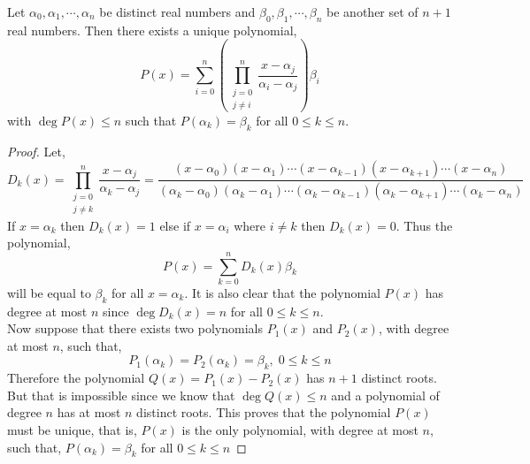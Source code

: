 \documentclass[11pt,numbers=noenddot,svgnames]{scrbook}
\DeclareMathOperator{\Deg}{deg}
\begin{document}
\begin{theorem}\label{thm:lagrange-interpol}
    Let $\alpha_{0}, \alpha_{1},\cdots , \alpha_{n}$ be distinct real numbers and 
    $\beta_{0}, \beta_{1}, \cdots, \beta_{n}$ be another set of $n+1$ real numbers. 
    Then there exists a unique polynomial,
    \[
    P(x) = \sum_{i=0}^{n} \left( \prod_{\substack{j=0\\ j\neq i}}^{n} \frac{x - \alpha_{j}}{\alpha_{i} - \alpha_{j}} \right) \beta_{i}
    \]
    with $\Deg P(x) \leq n$ such that $P(\alpha_{k}) = \beta_{k}$ for all $0\leq k \leq n$.
\end{theorem}
\begin{proof}
    Let,
    \[
    D_{k}(x) = \prod_{\substack{j=0 \\ j\neq k}}^{n} \frac{x - \alpha_{j}}{\alpha_{k} - \alpha_{j}} = 
    \frac{(x-\alpha_{0})(x-\alpha_{1})\cdots (x - \alpha_{k-1})(x - \alpha_{k+1}) \cdots (x - \alpha_{n})}
         {(\alpha_{k}-\alpha_{0})(\alpha_{k}-\alpha_{1})\cdots (\alpha_{k} - \alpha_{k-1})(\alpha_{k} - \alpha_{k+1}) \cdots (\alpha_{k} - \alpha_{n})}
    \]
    If $x=\alpha_k$ then $D_k(x) = 1$ else if $x=\alpha_i$ where 
    $i \neq k$ then $D_k(x)=0$. Thus the polynomial,
    \[ P(x) = \sum_{k=0}^n D_k(x) \beta_k \]
    will be equal to $\beta_k$ for all $x=\alpha_k$. It is also clear that the 
    polynomial $P(x)$ has degree at most $n$ since $\Deg D_k(x)=n$ for all 
    $0 \leq k \leq n$. \\
    Now suppose that there exists two polynomials $P_1(x)$ and $P_2(x)$, with degree at 
    most $n$, such that,
    \[ P_1(\alpha_k) = P_2(\alpha_k) = \beta_k, \; 0\leq k \leq n\]
    Therefore the polynomial $Q(x) = P_1(x) - P_2(x)$ has $n+1$ distinct roots. 
    But that is impossible since we know that $\Deg Q(x) \leq n$ and 
    a polynomial of degree $n$ has at most $n$ distinct roots. This proves that 
    the polynomial $P(x)$ must be unique, that is, $P(x)$ is the only polynomial, with 
    degree at most $n$, such that, 
    $P(\alpha_k) = \beta_k$ for all $0 \leq k \leq n$
\end{proof}
\end{document}
